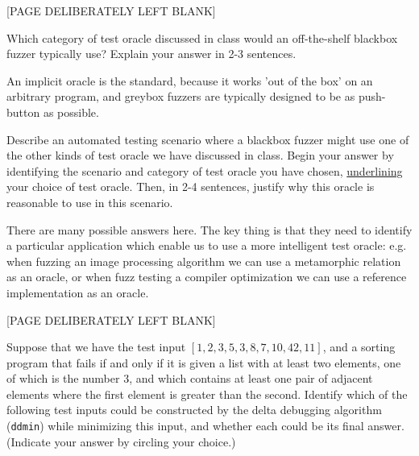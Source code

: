 \documentclass[addpoints]{exam}
\newcommand{\Code}[1]{\texttt{#1}}
\begin{document}
\begin{questions}
\newpage
\begin{center}
  [PAGE DELIBERATELY LEFT BLANK]
\end{center}
\newpage


\question[2] Which category of test oracle discussed in class would an
  off-the-shelf blackbox fuzzer typically use? Explain your answer in
  2-3 sentences.

  \begin{solutionorbox}[3.5in]
    An implicit oracle is the standard, because it works 'out of the
    box' on an arbitrary program, and greybox fuzzers are typically
    designed to be as push-button as possible.
  \end{solutionorbox}

\question[3] Describe an automated testing scenario where a blackbox
  fuzzer might use one of the other kinds of test oracle we have
  discussed in class. Begin your answer by identifying the scenario
  and category of test oracle you have chosen, \underline{underlining}
  your choice of test oracle.  Then, in 2-4 sentences, justify why this oracle is
  reasonable to use in this scenario.

  \begin{solutionorbox}[3.9in]
    There are many possible answers here. The key thing is that they
    need to identify a particular application which enable us to use a
    more intelligent test oracle: e.g. when fuzzing an image
    processing algorithm we can use a metamorphic relation as an
    oracle, or when fuzz testing a compiler optimization we can use a
    reference implementation as an oracle.
  \end{solutionorbox}

\newpage
\begin{center}
  [PAGE DELIBERATELY LEFT BLANK]
\end{center}
\newpage


\question Suppose that we have the test input
  $[1, 2, 3, 5, 3, 8, 7, 10, 42, 11]$, and a sorting program that
  fails if and only if it is given a list with at least two elements,
  one of which is the number $3$, and which contains at least one pair
  of adjacent elements where the first element is greater than the
  second. Identify which of the following test inputs could be
  constructed by the delta debugging algorithm (\Code{ddmin}) while
  minimizing this input, and whether each could be its final
  answer. (Indicate your answer by circling your choice.)


\end{questions}
\end{document}
